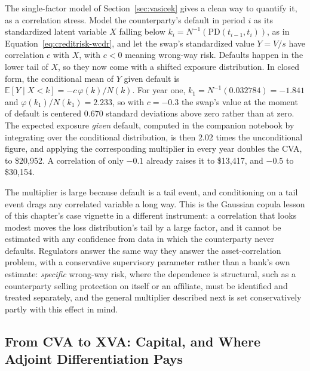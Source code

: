 \documentclass[../ai_in_finance]{subfiles}
\begin{document}
The single-factor model of Section~\ref{sec:vasicek} gives a clean way to quantify it, as a correlation stress. Model the counterparty's default in period $i$ as its standardized latent variable $X$ falling below $k_i = N^{-1}(\text{PD}(t_{i-1},t_i))$, as in Equation~\eqref{eq:creditrisk-wcdr}, and let the swap's standardized value $Y = V/s$ have correlation $c$ with $X$, with $c<0$ meaning wrong-way risk. Defaults happen in the lower tail of $X$, so they now come with a shifted exposure distribution. In closed form, the conditional mean of $Y$ given default is $\mathbb{E}[Y \mid X < k] = -c\,\varphi(k)/N(k)$. For year one, $k_1 = N^{-1}(0.032784) = -1.841$ and $\varphi(k_1)/N(k_1) = 2.233$, so with $c = -0.3$ the swap's value at the moment of default is centered $0.670$ standard deviations above zero rather than at zero. The expected exposure \emph{given} default, computed in the companion notebook by integrating over the conditional distribution, is then $2.02$ times the unconditional figure, and applying the corresponding multiplier in every year doubles the CVA, to \$20{,}952. A correlation of only $-0.1$ already raises it to \$13{,}417, and $-0.5$ to \$30{,}154.

The multiplier is large because default is a tail event, and conditioning on a tail event drags any correlated variable a long way. This is the Gaussian copula lesson of this chapter's case vignette in a different instrument: a correlation that looks modest moves the loss distribution's tail by a large factor, and it cannot be estimated with any confidence from data in which the counterparty never defaults. Regulators answer the same way they answer the asset-correlation problem, with a conservative supervisory parameter rather than a bank's own estimate: \emph{specific} wrong-way risk, where the dependence is structural, such as a counterparty selling protection on itself or an affiliate, must be identified and treated separately, and the general multiplier described next is set conservatively partly with this effect in mind.

\subsection{From CVA to XVA: Capital, and Where Adjoint Differentiation Pays}
\label{sec:xva}
\end{document}
